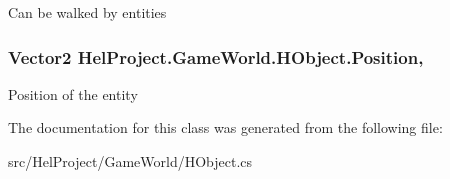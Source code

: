 Can be walked by entities 

\hypertarget{class_hel_project_1_1_game_world_1_1_h_object_af5297b9bdeac2d179b0bee66ff111f94}{}
\subsubsection[{Position}]{\setlength{\rightskip}{0pt plus 5cm}Vector2 Hel\+Project.\+Game\+World.\+H\+Object.\+Position\hspace{0.3cm}{\ttfamily [get]}, {\ttfamily [set]}}\label{class_hel_project_1_1_game_world_1_1_h_object_af5297b9bdeac2d179b0bee66ff111f94}


Position of the entity 



The documentation for this class was generated from the following file\+:\begin{DoxyCompactItemize}
\item 
src/\+Hel\+Project/\+Game\+World/H\+Object.\+cs\end{DoxyCompactItemize}
